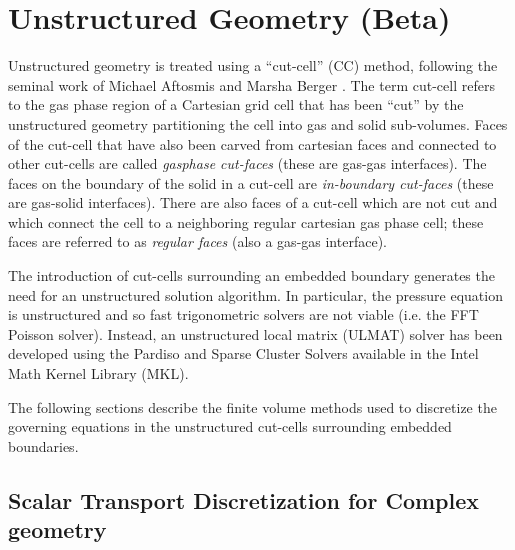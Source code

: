 






\chapter{Unstructured Geometry (Beta)}
\label{sec:unstructured_geometry}

Unstructured geometry is treated using a ``cut-cell'' (CC) method, following the seminal work of Michael Aftosmis and Marsha Berger \cite{Berger:2012,Berger:2017,May:2017}.  The term cut-cell refers to the gas phase region of a Cartesian grid cell that has been ``cut'' by the unstructured geometry partitioning the cell into gas and solid sub-volumes.  Faces of the cut-cell that have also been carved from cartesian faces and connected to other cut-cells are called \emph{gasphase cut-faces} (these are gas-gas interfaces).  The faces on the boundary of the solid in a cut-cell are \emph{in-boundary cut-faces} (these are gas-solid interfaces).  There are also faces of a cut-cell which are not cut and which connect the cell to a neighboring regular cartesian gas phase cell; these faces are referred to as \emph{regular faces} (also a gas-gas interface).

The introduction of cut-cells surrounding an embedded boundary generates the need for an unstructured solution algorithm.  In particular, the pressure equation is unstructured and so fast trigonometric solvers are not viable (i.e. the {\ct FFT} Poisson solver).  Instead, an unstructured local matrix ({\ct ULMAT}) solver has been developed using the Pardiso and Sparse Cluster Solvers available in the Intel Math Kernel Library (MKL).

The following sections describe the finite volume methods used to discretize the governing equations in the unstructured cut-cells surrounding embedded boundaries.

\section{Scalar Transport Discretization for Complex geometry}

